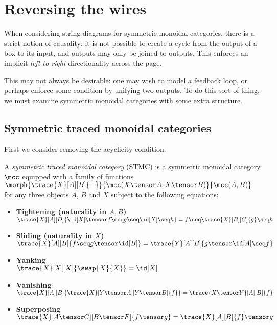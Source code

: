 \section{Reversing the wires}

When considering string diagrams for symmetric monoidal categories, there is a
strict notion of causality: it is not possible to create a cycle from the output
of a box to its input, and outputs may only be joined to outputs.
This enforces an implicit \emph{left-to-right} directionality across the page.

This may not always be desirable: one may wish to model a feedback
loop, or perhaps enforce some condition by unifying two outputs.
To do this sort of thing, we must examine symmetric monoidal categories with
some extra structure.

\subsection{Symmetric traced monoidal categories}

First we consider removing the acyclicity condition.

\begin{definition}\label{def:stmc}
    A \emph{symmetric traced monoidal category} (STMC) is a symmetric monoidal
    category \(\mcc\) equipped with a family of functions \(
    \morph{
        \trace{X}[A][B]{-}
    }{
        \mcc(X \tensor A, X \tensor B)
    }{
        \mcc(A, B)
    }
    \) for any three objects \(A\), \(B\) and \(X\) subject to the following
    equations:
    \begin{itemize}
        \item \textbf{Tightening (naturality in \(A,B\))}\\\null\qquad
              \(\trace{X}[A][D]{
                  \id[X] \tensor f \seq g \seq \id[X] \seq h
              }
              =
              f \seq \trace{X}[B][C]{g} \seq h
              \)
        \item \textbf{Sliding (naturality in \(X\))}\\\null\qquad
              \(
              \trace{X}[A][B]{f \seq g \tensor \id[B]}
              =
              \trace{Y}[A][B]{g \tensor \id[A] \seq f}
              \)
        \item \textbf{Yanking}\\\null\qquad
              \(
              \trace{X}[X][X]{\swap{X}{X}} = \id[X]
              \)
        \item \textbf{Vanishing}\\\null\qquad
              \(
              \trace{X}[A][B]{\trace{X}[Y \tensor A][Y \tensor B]{f}}
              =
              \trace{X \tensor Y}[A][B]{f}
              \)
        \item \textbf{Superposing}\\\null\qquad
              \(
              \trace{X}[A \tensor C][B \tensor F]{f \tensor g}
              = \trace{X}[A][B]{f} \tensor g
              \)
    \end{itemize}
\end{definition}

